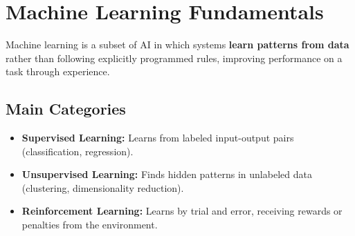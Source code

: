 \documentclass[11pt,a4paper]{article}
\begin{document}
\section{Machine Learning Fundamentals}

\begin{definitionbox}
Machine learning is a subset of AI in which systems \textbf{learn patterns from data} rather than following explicitly programmed rules, improving performance on a task through experience.
\end{definitionbox}

\subsection{Main Categories}
\begin{center}
\end{center}
\begin{itemize}[leftmargin=*]
  \item \textbf{Supervised Learning:} Learns from labeled input-output pairs (classification, regression).
  \item \textbf{Unsupervised Learning:} Finds hidden patterns in unlabeled data (clustering, dimensionality reduction).
  \item \textbf{Reinforcement Learning:} Learns by trial and error, receiving rewards or penalties from the environment.
\end{itemize}
\end{document}
